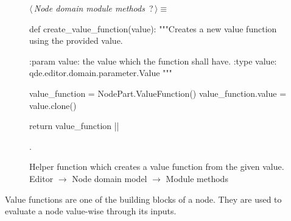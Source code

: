 \documentclass[%
    a4paper,    %
    justified,  %
    nobib,      %
    openany     %
]{tufte-book}
\begin{document}
\begin{figure}
\begin{flushleft} \small
\begin{minipage}{\linewidth}\label{scrap112}\raggedright\small
{} $\langle\,${\itshape Node domain module methods}\nobreak\ {\footnotesize {?}}$\,\rangle\equiv$
\vspace{-1ex}
\begin{pythoncode}
def create_value_function(value):
    """Creates a new value function using the provided value.

    :param value: the value which the function shall have.
    :type  value: qde.editor.domain.parameter.Value
    """

    value_function = NodePart.ValueFunction()
    value_function.value = value.clone()

    return value_function
|\NWsep|
\end{pythoncode}
\vspace{1.5ex}
\footnotesize
\begin{list}{}{\setlength{\itemsep}{-\parsep}\setlength{\itemindent}{-\leftmargin}}
\item {\NWtxtMacroNoRef}.

\item{}
\end{list}
\end{minipage}\vspace{4ex}
\end{flushleft}
\caption{Helper function which creates a value function from the given value.
  \newline{}\newline{}Editor $\rightarrow$ Node domain model $\rightarrow$
  Module methods}
\label{editor:lst:node-domain-model:module-methods:create-value-function}
\end{figure}

 Value functions are
one of the building blocks of a node. They are used to evaluate a node
value-wise through its inputs.
\end{document}
